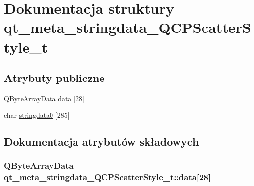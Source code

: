 \hypertarget{structqt__meta__stringdata___q_c_p_scatter_style__t}{}\section{Dokumentacja struktury qt\+\_\+meta\+\_\+stringdata\+\_\+\+Q\+C\+P\+Scatter\+Style\+\_\+t}
\label{structqt__meta__stringdata___q_c_p_scatter_style__t}
\subsection*{Atrybuty publiczne}
\begin{DoxyCompactItemize}
\item 
Q\+Byte\+Array\+Data \hyperlink{structqt__meta__stringdata___q_c_p_scatter_style__t_acb6d48bc3c9529aa0eecc8d37930f3c6}{data} \mbox{[}28\mbox{]}
\item 
char \hyperlink{structqt__meta__stringdata___q_c_p_scatter_style__t_a6689ed585bd8409634a978fad9b94c3a}{stringdata0} \mbox{[}285\mbox{]}
\end{DoxyCompactItemize}


\subsection{Dokumentacja atrybutów składowych}
\subsubsection[{\texorpdfstring{data}{data}}]{\setlength{\rightskip}{0pt plus 5cm}Q\+Byte\+Array\+Data qt\+\_\+meta\+\_\+stringdata\+\_\+\+Q\+C\+P\+Scatter\+Style\+\_\+t\+::data\mbox{[}28\mbox{]}}\hypertarget{structqt__meta__stringdata___q_c_p_scatter_style__t_acb6d48bc3c9529aa0eecc8d37930f3c6}{}\label{structqt__meta__stringdata___q_c_p_scatter_style__t_acb6d48bc3c9529aa0eecc8d37930f3c6}
